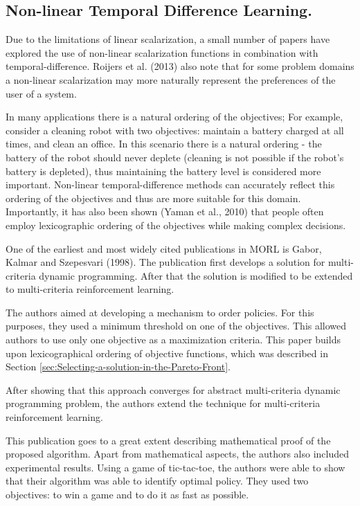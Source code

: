 \subsection{Non-linear Temporal Difference Learning.}
Due to the limitations of linear scalarization, a small number of papers have explored the use of non-linear scalarization functions in combination with temporal-difference. Roijers et al. (2013)\nocite{roijers2013survey} also note that for some problem domains a non-linear scalarization may more naturally represent the preferences of the user of a system.

In many applications there is a natural ordering of the objectives; For example, consider a cleaning robot with two objectives: maintain a battery charged at all times, and clean an office. In this scenario there is a natural ordering - the battery of the robot should never deplete (cleaning is not possible if the robot's battery is depleted), thus maintaining the battery level is considered more important. Non-linear temporal-difference methods can accurately reflect this ordering of the objectives and thus are more suitable for this domain. Importantly, it has also been shown (Yaman et al., 2010\nocite{Yaman20111290}) that people often employ lexicographic ordering of the objectives while making complex decisions.

One of the earliest and most widely cited publications in MORL is Gabor, Kalmar and Szepesvari (1998)\nocite{gabor1998multi}. The publication first develops a solution for multi-criteria dynamic programming. After that the solution is modified to be extended to multi-criteria reinforcement learning.

The authors aimed at developing a mechanism to order policies. For this purposes, they used a minimum threshold on one of the objectives. This allowed authors to use only one objective as a maximization criteria. This paper builds upon lexicographical ordering of objective functions, which was described in Section \ref{sec:Selecting-a-solution-in-the-Pareto-Front}.

After showing that this approach converges for abstract multi-criteria dynamic programming problem, the authors extend the technique for multi-criteria reinforcement learning.

This publication goes to a great extent describing mathematical proof of the proposed algorithm. Apart from mathematical aspects, the authors also included experimental results. Using a game of tic-tac-toe, the authors were able to show that their algorithm was able to identify optimal policy. They used two objectives: to win a game and to do it as fast as possible.

